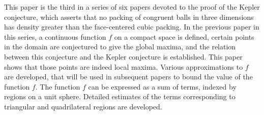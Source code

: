 This paper is the third in a series of six papers devoted to the
proof of the Kepler conjecture, which asserts that no packing of
congruent balls in three dimensions has density greater than the
face-centered cubic packing.  In the previous paper in this series,
a continuous function $f$ on a compact space is defined, certain
points in the domain are conjectured to give the global maxima, and
the relation between this conjecture and the Kepler conjecture is
established. This paper shows that those points are indeed local
maxima. Various approximations to $f$ are developed, that will be
used in subsequent papers to bound the value of the function $f$.
The function $f$ can be expressed as a sum of terms, indexed by
regions on a unit sphere. Detailed estimates of the terms
corresponding to triangular and quadrilateral regions are developed.

